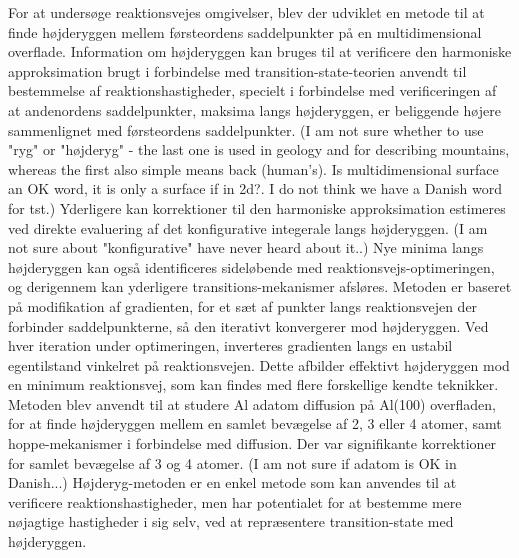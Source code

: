 For at undersøge reaktionsvejes omgivelser, blev der udviklet en metode til at finde højderyggen mellem førsteordens saddelpunkter på en multidimensional overflade.
Information om højderyggen kan bruges til at verificere den harmoniske approksimation brugt i forbindelse med transition-state-teorien anvendt til bestemmelse af reaktionshastigheder, specielt i forbindelse med verificeringen af at andenordens saddelpunkter, maksima langs højderyggen, er beliggende højere sammenlignet med førsteordens saddelpunkter.
(I am not sure whether to use "ryg" or "højderyg" - the last one is used in geology and for describing mountains, whereas the first also simple means back (human's). Is multidimensional surface an OK word, it is only a surface if in 2d?. I do not think we have a Danish word for tst.)
Yderligere kan korrektioner til den harmoniske approksimation estimeres ved direkte evaluering af det konfigurative integerale langs højderyggen. (I am not sure about "konfigurative" have never heard about it..)
Nye minima langs højderyggen kan også identificeres sideløbende med reaktionsvejs-optimeringen, og derigennem kan yderligere transitions-mekanismer afsløres.
Metoden er baseret på modifikation af gradienten, for et sæt af punkter langs reaktionsvejen der forbinder saddelpunkterne, så den iterativt konvergerer mod højderyggen.
Ved hver iteration under optimeringen, inverteres gradienten langs en ustabil egentilstand vinkelret på reaktionsvejen. Dette afbilder effektivt højderyggen mod en minimum reaktionsvej, som kan findes med flere forskellige kendte teknikker.
Metoden blev anvendt til at studere Al adatom diffusion på Al(100) overfladen, for at finde højderyggen mellem en samlet bevægelse af 2, 3 eller 4 atomer, samt hoppe-mekanismer i forbindelse med diffusion.
Der var signifikante korrektioner for samlet bevægelse af 3 og 4 atomer. 
(I am not sure if adatom is OK in Danish...)
Højderyg-metoden er en enkel metode som kan anvendes til at verificere reaktionshastigheder, men har potentialet for at bestemme mere nøjagtige hastigheder i sig selv, ved at repræsentere transition-state med højderyggen.



